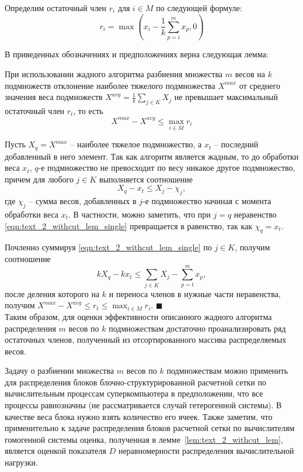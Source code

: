 Определим остаточный член $r_i$ для $i \in M$ по следующей формуле:
\begin{equation}
	r_i = \max{\left( x_i - \frac{1}{k} \sum_{p = i}^{m}{x_p}, 0 \right)}
\end{equation}

В приведенных обозначениях и предположениях верна следующая лемма:

\begin{lemma}\label{lem:text_2_withcut_lem}
При использовании жадного алгоритма разбиения множества $m$ весов на $k$ подмножеств отклонение наиболее тяжелого подмножества $X^{max}$ от среднего значения веса подмножеств $X^{avg} = \frac{1}{k} \sum_{j \in K}{X_j}$ не превышает максимальный остаточный член $r_i$, то есть
\begin{equation}
	X^{max} - X^{avg} \le \max_{i \in M}{r_i}
\end{equation}
\end{lemma}
Пусть $X_q = X^{max}$ -- наиболее тяжелое подмножество, а $x_t$ -- последний добавленный в него элемент.
Так как алгоритм является жадным, то до обработки веса $x_t$, $q$-е подмножество не превосходит по весу никакое другое подмножество, причем для любого $j \in K$ выполняется соотношение
\begin{equation}\label{eqn:text_2_withcut_lem_single}
	X_q - x_t \le X_j - \chi_j,
\end{equation}	
где $\chi_j$ -- сумма весов, добавленных в $j$-е подмножество начиная с момента обработки веса $x_t$.
В частности, можно заметить, что при $j = q$ неравенство \eqref{eqn:text_2_withcut_lem_single} превращается в равенство, так как $\chi_q = x_t$.

Почленно суммируя \eqref{eqn:text_2_withcut_lem_single} по $j \in K$, получим соотношение
\begin{equation}
	k X_q - k x_t \le \sum_{j \in K}{X_j} - \sum_{p = t}^{m}{x_p},
\end{equation}
после деления которого на $k$ и переноса членов в нужные части неравенства, получим $X^{max} - X^{avg} \le r_t \le \max_{i \in M}{r_i}$.
$\blacksquare$\\

Таким образом, для оценки эффективности описанного жадного алгоритма распределения $m$ весов по $k$ подмножествам достаточно проанализировать ряд остаточных членов, полученный из отсортированного массива распределяемых весов.

Задачу о разбиении множества $m$ весов по $k$ подмножествам можно применить для распределения блоков блочно-структурированной расчетной сетки по вычислительным процессам суперкомпьютера в предположении, что все процессы равнозначны (не рассматривается случай гетерогенной системы).
В качестве веса блока нужно взять количество его ячеек.
Также заметим, что применительно к задаче распределения блоков расчетной сетки по вычислителям гомогенной системы оценка, полученная в лемме~\ref{lem:text_2_withcut_lem}, является оценкой показателя $D$ неравномерности распределения вычислительной нагрузки.

